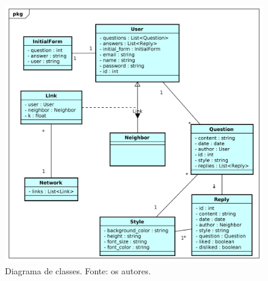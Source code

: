 \begin{figure}[!htb]
\centering
\includegraphics[width=16cm]{DiagramaClasse.png}
\caption{Diagrama de classes. Fonte: os autores.}
\label{fig:diagramaClasse}
\end{figure}
